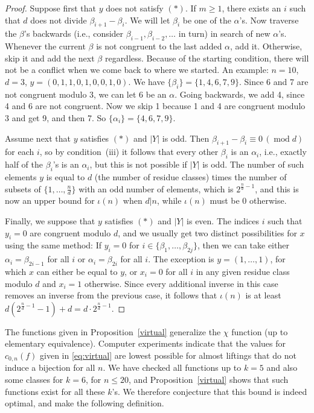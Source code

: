 \documentclass[11pt,english,a4paper]{amsart}
\theoremstyle{plain}
\theoremstyle{definition}
\theoremstyle{remark}
\begin{document}
\begin{proof}
		Suppose first that $y$ does not satisfy $(*)$.
		If $m \geq 1$, there exists an $i$ such that $d$ does not divide $\beta_{i+1}-\beta_i$. We will let $\beta_i$ be one of the $\alpha$'s. Now traverse the $\beta$'s backwards (i.e., consider $\beta_{i-1}, \beta_{i-2}, \dotsc$ in turn) in search of new $\alpha$'s. Whenever the current $\beta$ is not congruent to the last added $\alpha$, add it. Otherwise, skip it and add the next $\beta$ regardless. Because of the starting condition, there will not be a conflict when we come back to where we started. An example: $n=10$, $d=3$, $y = (0, 1, 1, 0, 1, 0, 0, 1, 0)$. We have $\{\beta_i \}= \{1, 4, 6, 7, 9\}$. Since 6 and 7 are not congruent modulo 3, we can let 6 be an $\alpha$. Going backwards, we add 4, since 4 and 6 are not congruent. Now we skip 1 because 1 and 4 are congruent modulo 3 and get 9, and then 7. So $\{\alpha_i\} = \{4, 6, 7, 9\}$.
		
		Assume next that $y$ satisfies $(*)$ and $\lvert Y\rvert$ is odd.
		Then $\beta_{i+1} - \beta_i \equiv 0\, (\operatorname{mod} d)$ for each $i$,
		so by condition~(iii) it follows that every other $\beta_i$ is an $\alpha_i$, i.e.,
		exactly half of the $\beta_i$'s is an $\alpha_i$,
		but this is not possible if $\lvert Y \rvert$ is odd.
		The number of such elements $y$ is equal to $d$ (the number of residue classes) times the number of subsets of $\{1, \dotsc, \frac{n}{d}\}$ with an odd number of elements, which is $2^{\frac{n}{d}-1}$, and this is now an upper bound for $\iota(n)$ when $d|n$, while $\iota(n)$ must be $0$ otherwise.
		
		Finally, we suppose that $y$ satisfies $(*)$ and $\lvert Y\rvert$ is even.
		The indices $i$ such that $y_i=0$ are congruent modulo $d$,
		and we usually get two distinct possibilities for $x$ using the same method: If $y_i=0$ for $i \in \{\beta_1, \dotsc, \beta_{2j}\}$, then we can take either $\alpha_i = \beta_{2i-1}$ for all $i$ or $\alpha_i = \beta_{2i}$ for all $i$. The exception is $y=(1, \dotsc, 1)$, for which $x$ can either be equal to $y$, or $x_i=0$ for all $i$ in any given residue class modulo $d$ and $x_i=1$ otherwise. Since every additional inverse in this case removes an inverse from the previous case, it follows that $\iota(n)$ is at least $d(2^{\frac{n}{d}-1}-1)+d=d \cdot 2^{\frac{n}{d}-1}$.
	\end{proof}
	

	
	
	The functions given in Proposition~\ref{virtual} generalize the $\chi$ function (up to elementary equivalence). Computer experiments indicate that the values for $c_{0,n}(f)$ given in \eqref{eq:virtual} are lowest possible for almost liftings that do not induce a bijection for all $n$. We have checked all functions up to $k=5$ and also some classes for $k=6$, for $n\leq 20$, and Proposition~\ref{virtual} shows that such functions exist for all these $k$'s. We therefore conjecture that this bound is indeed optimal, and make the following definition.
	
\end{document}
